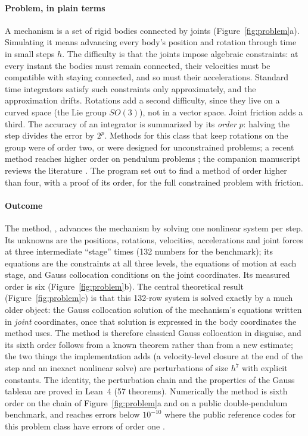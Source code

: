 \paragraph{Problem, in plain terms}
A mechanism is a set of rigid bodies connected by joints (Figure~\ref{fig:problem}a). Simulating it
means advancing every body's position and rotation through time in small steps $h$. The
difficulty is that the joints impose algebraic constraints: at every instant the bodies must
remain connected, their velocities must be compatible with staying connected, and so must their
accelerations. Standard time integrators satisfy such constraints only approximately, and the
approximation drifts. Rotations add a second difficulty, since they live on a curved space
(the Lie group $SO(3)$), not in a vector space. Joint friction adds a third. The accuracy of an
integrator is summarized by its \emph{order} $p$: halving the step divides the error by $2^p$.
Methods for this class that keep rotations on the group were of order two, or were designed for
unconstrained problems; a recent method reaches higher order on pendulum problems
\citep{chaturvedi2026tfe}; the companion manuscript reviews the literature
\citep{munthekaas1998rk,bruls2012lie,hairer1996solving,kissel2022absolute,fang2023halfimplicit}. The program set out to find a method of order higher than four, with a
proof of its order, for the full constrained problem with friction.

\paragraph{Outcome}
The method, \method{}, advances the mechanism by solving one nonlinear system per step. Its
unknowns are the positions, rotations, velocities, accelerations and joint forces at three
intermediate ``stage'' times (132 numbers for the benchmark); its equations are the constraints at
all three levels, the equations of motion at each stage, and Gauss collocation conditions on the
joint coordinates. Its measured order is six (Figure~\ref{fig:problem}b). The central theoretical
result (Figure~\ref{fig:problem}c) is that this 132-row system is solved exactly by a much older
object: the Gauss collocation solution of the mechanism's equations written in \emph{joint}
coordinates, once that solution is expressed in the body coordinates the method uses. The method is
therefore classical Gauss collocation in disguise, and its sixth order follows from a known theorem
rather than from a new estimate; the two things the implementation adds (a velocity-level closure
at the end of the step and an inexact nonlinear solve) are perturbations of size $h^7$ with
explicit constants. The identity, the perturbation chain and the properties of the Gauss tableau
are proved in Lean~4 (57 theorems). Numerically the method is sixth order on the chain of
Figure~\ref{fig:problem}a and on a public double-pendulum benchmark, and reaches errors below
$10^{-10}$ where the public reference codes for this problem class have errors of order one
\citep{wang2026gauss6}.

